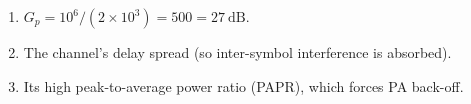 \begin{enumerate}[leftmargin=1.6em,itemsep=2pt]
\item $G_p = 10^{6}/(2\times10^{3}) = 500 = 27\ \text{dB}$.
\item The channel's delay spread (so inter-symbol interference is absorbed).
\item Its high peak-to-average power ratio (PAPR), which forces PA back-off.
\end{enumerate}
